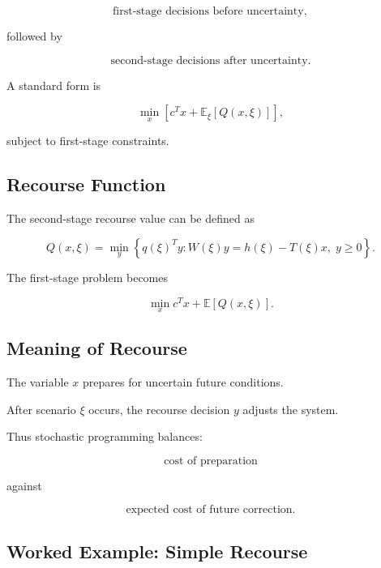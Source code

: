 \[
\boxed{
\text{first-stage decisions before uncertainty},
}
\]

followed by

\[
\boxed{
\text{second-stage decisions after uncertainty}.
}
\]

A standard form is

\[
\boxed{
\min_x
\left[
c^Tx
+
\mathbb{E}_{\xi}
[
Q(x,\xi)
]
\right],
}
\]

subject to first-stage constraints.

\subsection{Recourse Function}
\label{subsec:recourse-function}

The second-stage recourse value can be defined as

\[
\boxed{
Q(x,\xi)
=
\min_y
\left\{
q(\xi)^Ty:
W(\xi)y
=
h(\xi)-T(\xi)x,
\;
y\geq0
\right\}.
}
\]

The first-stage problem becomes

\[
\boxed{
\min_x
c^Tx
+
\mathbb{E}
[
Q(x,\xi)
].
}
\]

\subsection{Meaning of Recourse}
\label{subsec:meaning-of-recourse}

The variable \(x\) prepares for uncertain future conditions.

After scenario \(\xi\) occurs, the recourse decision \(y\) adjusts the
system.

Thus stochastic programming balances:

\[
\boxed{
\text{cost of preparation}
}
\]

against

\[
\boxed{
\text{expected cost of future correction}.
}
\]

\subsection{Worked Example: Simple Recourse}
\label{subsec:worked-simple-recourse}

